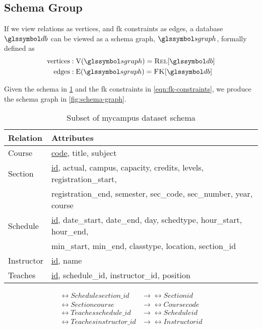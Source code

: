 	\subsection{Schema Group}
		\begin{defn}
		\label{def:schema-graph}
			If we view relations as vertices, and \gls{fk} constraints as edges, a database \(\db\) can be viewed as a schema graph, \(\sgraph{}\), formally defined as
			\begin{align}
				\text{vertices} &: \text{V}(\sgraph) = \relations{\db} \\
				\text{edges} &: \text{E}(\sgraph) = \fks{\db}
			\end{align}
		\end{defn}
		
		\begin{ex}
			Given the schema in \cref{tbl:schema} and the \gls{fk} constraints in \cref{eqn:fk-constraints}, we produce the schema graph in \cref{fig:schema-graph}.
			
			\begin{table}
				\centering
				
				\begin{tabular}{ll}
					\toprule
					Relation & Attributes \\
					\midrule
					Course & \underline{code}, title, subject \\
					Section & \underline{id}, actual, campus, capacity, credits, levels, registration\_start, \\
					 & registration\_end, semester, sec\_code, sec\_number, year, course \\
					Schedule & \underline{id}, date\_start, date\_end, day, schedtype, hour\_start, hour\_end, \\
					 & min\_start, min\_end, classtype, location, section\_id \\
					Instructor & \underline{id}, name \\
					Teaches & \underline{id}, schedule\_id, instructor\_id, position \\
					\bottomrule
				\end{tabular}
				
				\caption{Subset of mycampus dataset schema}
				\label{tbl:schema}
			\end{table}
			
			\begin{figure}
				\begin{align*}
					\rel{Schedule}{section\_id} &\rightarrow \rel{Section}{id} \\
					\rel{Section}{course} &\rightarrow \rel{Course}{code} \\
					\rel{Teaches}{schedule\_id} &\rightarrow \rel{Schedule}{id} \\
					\rel{Teaches}{instructor\_id} &\rightarrow \rel{Instructor}{id} \\
				\end{align*}
				

\end{figure}
\end{ex}
